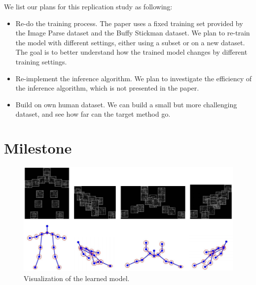 \documentclass[10pt,twocolumn,letterpaper]{article}
\begin{document}
We list our plans for this replication study as following:
\begin{itemize}
  \item Re-do the training process. The paper uses a fixed training set provided by the Image Parse dataset and the Buffy Stickman dataset. We plan to re-train the model with different settings, either using a subset or on a new dataset. The goal is to better understand how the trained model changes by different training settings. 
  \item Re-implement the inference algorithm. We plan to investigate the efficiency of the inference algorithm, which is not presented in the paper.
  \item Build on own human dataset. We can build a small but more challenging dataset, and see how far can the target method go.
  
\end{itemize}


\section{Milestone}
\label{}

\begin{figure}[t]
  \centering
  \includegraphics[width=17.3cm]{figure/templates.png}
  \caption{Visualization of the learned model.}
\label{}
\end{figure}
\end{document}
